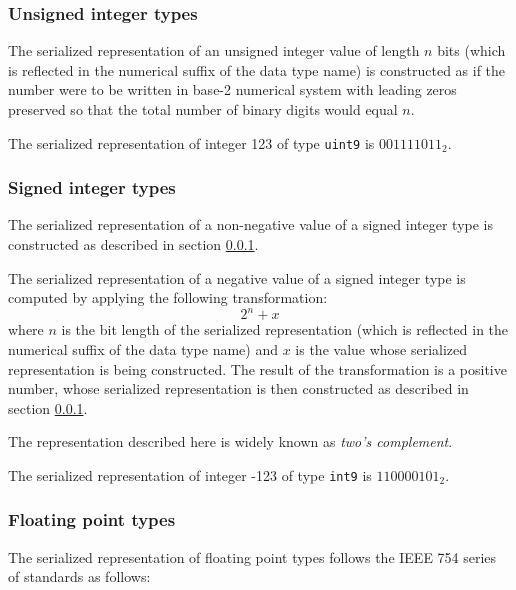\subsubsection{Unsigned integer types}\label{sec:dsdl_serialized_unsigned_integer}

The serialized representation of an unsigned integer value of length $n$ bits
(which is reflected in the numerical suffix of the data type name)
is constructed as if the number were to be written in base-2 numerical system
with leading zeros preserved so that the total number of binary digits would equal $n$.

\begin{remark}
    The serialized representation of integer 123 of type \verb|uint9| is $001111011_2$.
\end{remark}

\subsubsection{Signed integer types}

The serialized representation of a non-negative value of a signed integer type is constructed as described
in section \ref{sec:dsdl_serialized_unsigned_integer}.

The serialized representation of a negative value of a signed integer type is computed by
applying the following transformation:
$$2^n + x$$
where $n$ is the bit length of the serialized representation
(which is reflected in the numerical suffix of the data type name)
and $x$ is the value whose serialized representation is being constructed.
The result of the transformation is a positive number,
whose serialized representation is then constructed as described in section \ref{sec:dsdl_serialized_unsigned_integer}.

The representation described here is widely known as \emph{two's complement}.

\begin{remark}
    The serialized representation of integer -123 of type \verb|int9| is $110000101_2$.
\end{remark}

\subsubsection{Floating point types}

The serialized representation of floating point types follows the IEEE 754 series of standards as follows:

